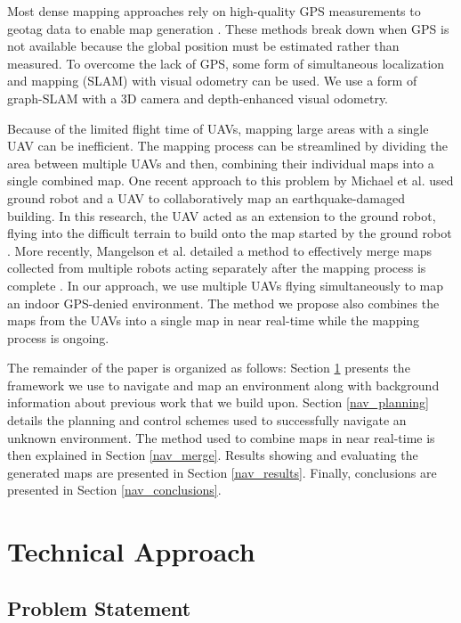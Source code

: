 \documentclass[letterpaper, 10 pt, conference]{ieeeconf}  %
\begin{document}
Most dense mapping approaches rely on high-quality GPS measurements to geotag data to enable map generation \cite{Siebert2014, Martin2015}. These methods break down when GPS is not available because the global position must be estimated rather than measured. To overcome the lack of GPS, some form of simultaneous localization and mapping (SLAM) with visual odometry can be used. We use a form of graph-SLAM with a 3D camera and depth-enhanced visual odometry.

Because of the limited flight time of UAVs, mapping large areas with a single UAV can be inefficient. The mapping process can be streamlined by dividing the area between multiple UAVs and then, combining their individual maps into a single combined map. One recent approach to this problem by Michael et al. used ground robot and a UAV to collaboratively map an earthquake-damaged building. In this research, the UAV acted as an extension to the ground robot, flying into the difficult terrain to build onto the map started by the ground robot \cite{Michael2012}. More recently, Mangelson et al. detailed a method to effectively merge maps collected from multiple robots acting separately after the mapping process is complete \cite{Mangelson2018}. In our approach, we use multiple UAVs flying simultaneously to map an indoor GPS-denied environment. The method we propose also combines the maps from the UAVs into a single map in near real-time while the mapping process is ongoing.

The remainder of the paper is organized as follows: Section \ref{nav_approach} presents the framework we use to navigate and map an environment along with background information about previous work that we build upon. Section \ref{nav_planning} details the planning and control schemes used to successfully navigate an unknown environment. The method used to combine maps in near real-time is then explained in Section \ref{nav_merge}. Results showing and evaluating the generated maps are presented in Section \ref{nav_results}. Finally, conclusions are presented in Section \ref{nav_conclusions}.

\section{Technical Approach}\label{nav_approach}

\subsection{Problem Statement}
\end{document}
